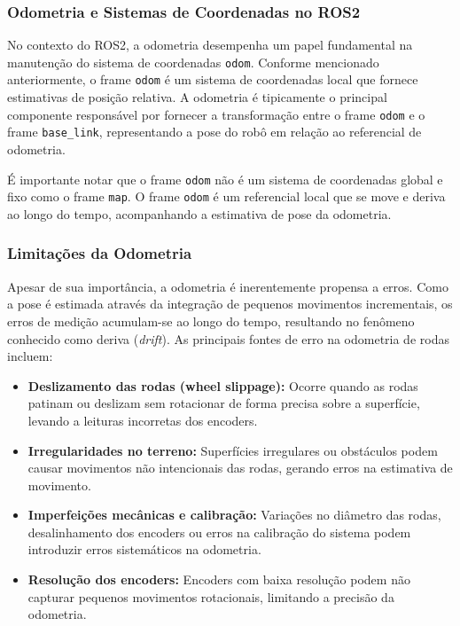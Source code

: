 \subsubsection{Odometria e Sistemas de Coordenadas no ROS2}

No contexto do ROS2, a odometria desempenha um papel fundamental na manutenção
do sistema de coordenadas \texttt{odom}. Conforme mencionado anteriormente, o
frame \texttt{odom} é um sistema de coordenadas local que fornece estimativas
de posição relativa. A odometria é tipicamente o principal componente
responsável por fornecer a transformação entre o frame \texttt{odom} e o frame
\texttt{base\_link}, representando a pose do robô em relação ao referencial de
odometria.

É importante notar que o frame \texttt{odom} não é um sistema de coordenadas global e fixo como o frame \texttt{map}. O frame \texttt{odom} é um referencial local que se move e deriva ao longo do tempo, acompanhando a estimativa de pose da odometria.

\subsubsection{Limitações da Odometria}

Apesar de sua importância, a odometria é inerentemente propensa a erros. Como a
pose é estimada através da integração de pequenos movimentos incrementais, os
erros de medição acumulam-se ao longo do tempo, resultando no fenômeno
conhecido como deriva (\textit{drift}). As principais fontes de erro na
odometria de rodas incluem:

\begin{itemize}
    \item \textbf{Deslizamento das rodas (wheel slippage):} Ocorre quando as rodas patinam ou deslizam sem rotacionar de forma precisa sobre a superfície, levando a leituras incorretas dos encoders.
    \item \textbf{Irregularidades no terreno:} Superfícies irregulares ou obstáculos podem causar movimentos não intencionais das rodas, gerando erros na estimativa de movimento.
    \item \textbf{Imperfeições mecânicas e calibração:} Variações no diâmetro das rodas, desalinhamento dos encoders ou erros na calibração do sistema podem introduzir erros sistemáticos na odometria.
    \item \textbf{Resolução dos encoders:} Encoders com baixa resolução podem não capturar pequenos movimentos rotacionais, limitando a precisão da odometria.
\end{itemize}

